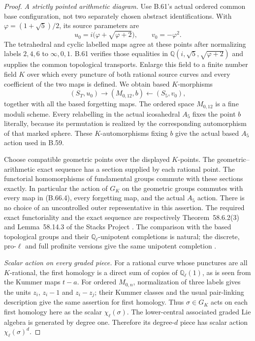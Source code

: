 \begin{proof}
\emph{A strictly pointed arithmetic diagram.}
Use B.61's actual ordered common base configuration,
not two separately chosen abstract identifications.
With $\varphi=(1+\sqrt5)/2$, its source parameters are
\[
 u_0=i\bigl(\varphi+\sqrt{\varphi+2}\bigr),\qquad
 v_0=-\varphi^2.
                                                               \tag{B.66.3}
\]
The tetrahedral and cyclic labelled maps agree at these
points after normalizing labels $2,4,6$ to
$\infty,0,1$.  B.61 verifies those equalities in
$\mathbb Q(i,\sqrt5,\sqrt{\varphi+2})$ and supplies the
common topological transports.
Enlarge this field to a finite number field $K$ over
which every puncture of both rational source curves and
every coefficient of the two maps is defined.
We obtain based $K$-morphisms
\[
 (S_T,u_0)\longrightarrow(M_{0,12},b)
        \longleftarrow(S_5,v_0),
                                                               \tag{B.66.4}
\]
together with all the based forgetting maps.
The ordered space $M_{0,12}$ is a fine moduli scheme.
Every relabelling in the actual icosahedral $A_5$ fixes
the point $b$ literally, because its permutation is
realized by the corresponding automorphism of that
marked sphere.  These $K$-automorphisms fixing $b$
give the actual based $A_5$ action used in B.59.

Choose compatible geometric points over the displayed
$K$-points.  The geometric--arithmetic exact sequence
has a section supplied by each rational point.
The functorial homomorphisms of fundamental groups
commute with these sections exactly.  In particular
the action of $G_K$ on the geometric groups commutes
with every map in (B.66.4), every forgetting map, and
the actual $A_5$ action.  There is no choice of an
uncontrolled outer representative in this assertion.
The required exact functoriality and the exact sequence
are respectively Theorem~58.6.2(3) and Lemma~58.14.3
of the Stacks Project \citep{DE_Stacks2026}.
The comparison with the based topological groups and
their $\mathbb Q_\ell$-unipotent completions is natural;
the discrete, pro-$\ell$ and full profinite versions
give the same unipotent completion
\citep[Appendix A, Theorem A.6, Lemma A.7 and
Corollary A.11]{DE_HainMatsumoto2003}.

\emph{Scalar action on every graded piece.}
For a rational curve whose punctures are all $K$-rational,
the first homology is a direct sum of copies of
$\mathbb Q_\ell(1)$, as is seen from the Kummer maps
$t-a$.  For ordered $M_{0,n}$, normalization of three
labels gives the units $z_i$, $z_i-1$ and $z_i-z_j$;
their Kummer classes and the usual pair-linking
description give the same assertion for first homology.
Thus $\sigma\in G_K$ acts on each first homology here
as the scalar $\chi_\ell(\sigma)$.
The lower-central associated graded Lie algebra is
generated by degree one.  Therefore its degree-$d$
piece has scalar action $\chi_\ell(\sigma)^d$.


\end{proof}
